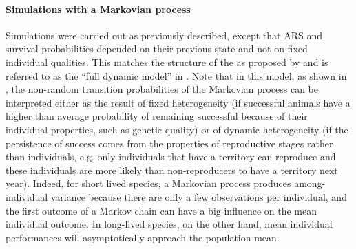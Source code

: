 \paragraph{Simulations with a Markovian process}
Simulations were carried out as previously described, except that ARS and survival probabilities depended on their previous state and not on fixed individual qualities. This matches the structure of the \NSM as proposed by \cite{Tuljapurkar2009} and is referred to as the ``full dynamic model'' in \cite{Plard2012}. Note that in this model, as shown in \cite{Plard2012}, the non-random transition probabilities of the Markovian process can be interpreted either as the result of fixed heterogeneity (if successful animals have a higher than average probability of remaining successful because of their individual properties, such as genetic quality) or of dynamic heterogeneity (if the persistence of success comes from the properties of reproductive stages rather than individuals, e.g. only individuals that have a territory can reproduce and these individuals are more likely than non-reproducers to have a territory next year). Indeed, for short lived species, a Markovian process produces among-individual variance because there are only a few observations per individual, and the first outcome of a Markov chain can have a big influence on the mean individual outcome. In long-lived species, on the other hand, mean individual performances will asymptotically approach the population mean. 

